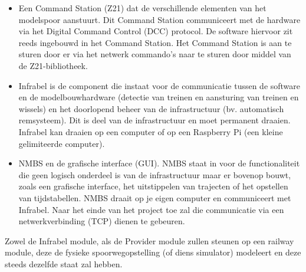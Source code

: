 \documentclass[a4paper, 11pt]{article}
\newcommand{\<}{\scriptsize\textless\normalsize}
\renewcommand{\>}{\scriptsize\textgreater\normalsize}
\begin{document}
\begin{itemize}
	\item Een Command Station (Z21) dat de verschillende elementen van het modelspoor aanstuurt. Dit Command Station communiceert met de hardware via het Digital Command Control (DCC) protocol. De software hiervoor zit reeds ingebouwd in het Command Station. Het Command Station is aan te sturen door er via het netwerk commando’s naar te sturen door middel van de Z21-bibliotheek.
	\item Infrabel is de component die instaat voor de communicatie tussen de software en de
	modelbouwhardware (detectie van treinen en aansturing van treinen en wissels) en het
	doorlopend beheer van de infrastructuur (bv. automatisch remsysteem). Dit is deel van de infrastructuur en moet permanent draaien. Infrabel kan draaien op een computer of op een Raspberry Pi (een kleine gelimiteerde computer).
	\item NMBS en de grafische interface (GUI). NMBS staat in voor de functionaliteit die geen
	logisch onderdeel is van de infrastructuur maar er bovenop bouwt, zoals een grafische
	interface, het uitstippelen van trajecten of het opstellen van tijdstabellen. NMBS draait
	op je eigen computer en communiceert met Infrabel. Naar het einde van het project toe
	zal die communicatie via een netwerkverbinding (TCP) dienen te gebeuren.
\end{itemize}
Zowel de Infrabel module, als de Provider module zullen steunen op een railway module, deze de fysieke spoorwegopstelling (of diens simulator) modeleert en deze steeds dezelfde staat zal hebben.

\newpage
\end{document}

